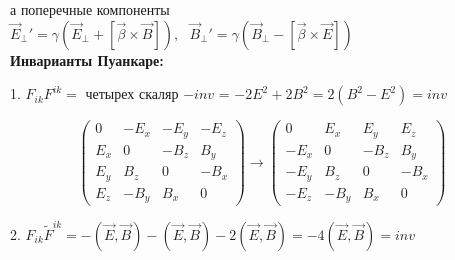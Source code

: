 \documentclass[12pt, a4paper]{report}
\begin{document}
    а поперечные компоненты \( \vec{E } _{\perp  }' = \gamma( \vec{ E }  _{ \perp } + [\vec{ \beta } \times  \vec{B}  ] ) , \text{ } \vec{B } _{\perp  }' = \gamma( \vec{ B }  _{ \perp } - [\vec{ \beta } \times  \vec{E}  ] )  \) \\

    \textbf{Инварианты Пуанкаре: } 

    1. \( F_{ik }  F^{ik }  =  \) четырех скаляр \( - inv \)  = \( - 2 E ^2 + 2 B ^2 = 2 (B ^2 - E ^2 ) = inv \)

    \[ \begin{pmatrix}
        0  & - E_x  & - E_y  & -E_z\\
        E_x  & 0  & - B_z  & B_y \\
        E_y  & B_z  & 0  & - B_x \\
        E_z  & -B_y  & B_x  & 0
        \end{pmatrix}  \to  
        \begin{pmatrix}
            0  &  E_x  &  E_y  & E_z\\
            -E_x  & 0  & - B_z  & B_y \\
            -E_y  & B_z  & 0  & - B_x \\
            -E_z  & -B_y  & B_x  & 0
            \end{pmatrix}  \] 

2. \( F_{ik }  \tilde{ F } ^{ ik }  = - (\vec{ E }  , \vec{ B } ) - ( \vec{ E }  , \vec{ B } ) - 2 (\vec{ E }  ,\vec{ B } ) = - 4 (\vec{ E } , \vec{ B } ) = inv \) 

\ifdefined\mainfile
\else
    
\end{document}
